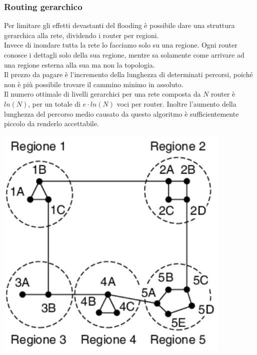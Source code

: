 \documentclass[10pt,a4paper,twoside]{article}
\begin{document}
\subsubsection{Routing gerarchico}
\begin{minipage}{0.7\textwidth}
Per limitare gli effetti devastanti del flooding è possibile dare una struttura gerarchica alla rete, dividendo i router per regioni.\\
Invece di inondare tutta la rete lo facciamo solo su una regione. Ogni router conosce i dettagli solo della sua regione, mentre sa solamente come arrivare ad una regione esterna alla sua ma non la topologia.\\
Il prezzo da pagare è l'incremento della lunghezza di determinati percorsi, poiché non è più possibile trovare il cammino minimo in assoluto.\\
Il numero ottimale di livelli gerarchici per una rete composta da $N$ router è $ln(N)$, per un totale di $e\cdot ln(N)$ voci per router.
Inoltre l'aumento della lunghezza del percorso medio causato da questo algoritmo è sufficientemente piccolo da renderlo accettabile.
\end{minipage}
\begin{minipage}{0.3\textwidth}
\begin{flushright}
\includegraphics[width=0.85\textwidth]{images/routing_gerarchico.png}
\end{flushright}
\end{minipage}
\end{document}

